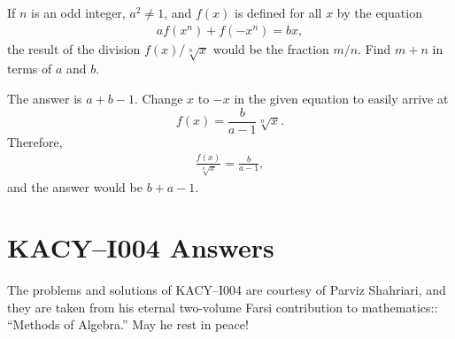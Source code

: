 \documentclass[12pt,a4paper]{memoir}
\theoremstyle{definition}
\begin{document}
\begin{tcolorbox}
	\begin{question}
		If $n$ is an odd integer, $a^2 \neq 1$, and $f(x)$ is defined for all $x$ by the equation
		\begin{align*}
			af(x^n) + f(-x^n) = bx,
		\end{align*}
		the result of the division $f(x)/\sqrt[n]{x}$ would be the fraction $m/n$. Find $m+n$ in terms of $a$ and $b$.
	\end{question}
\end{tcolorbox}

\begin{solution}%
	The answer is $a+b-1$. Change $x$ to $-x$ in the given equation to easily arrive at $$f(x)=\frac{b}{a-1}\sqrt[n]{x}.$$ Therefore,
	\begin{align*}
		\frac{f(x)}{\sqrt[n]{x}}=\frac{b}{a-1},
	\end{align*}
	and the answer would be $\boxed{b+a-1}$.
\end{solution}

			
			
	\newpage
	\section*{KACY--I004 Answers}
	The problems and solutions of KACY--I004 are courtesy of Parviz Shahriari, and they are taken from his eternal two-volume Farsi contribution to mathematics:: ``Methods of Algebra.'' May he rest in peace!
	
	\vspace{1em}
	
	\printsolutions
\end{document}
